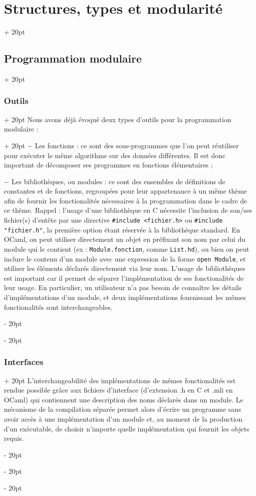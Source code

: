 \documentclass[a4paper, 12pt, twoside]{article}
\newcommand{\ind}[1][20pt]{\advance\leftskip + #1}
\newcommand{\deind}[1][20pt]{\advance\leftskip - #1}
\newenvironment{indt}[2][20pt]{#2 \par \ind[#1]}{\par \deind} %
\begin{document}
\begin{indt}{\section{Structures, types et modularité}}
\begin{indt}{\subsection{Programmation modulaire}}
\begin{indt}{\subsubsection{Outils}}
                \begin{indt}{Nous avons déjà évoqué deux types d’outils pour la programmation modulaire :}
                    $-$ Les fonctions : ce sont des sous-programmes que l’on peut réutiliser pour exécuter le même algorithme sur des données différentes. Il est donc important de décomposer ses programmes en fonctions élémentaires ;
                    
                    $-$ Les bibliothèques, ou modules : ce sont des ensembles de définitions de constantes et de fonctions, regroupées pour leur appartenance à un même thème afin de fournir les fonctionalités nécessaires à la programmation dans le cadre de ce thème.
                    Rappel : l’usage d’une bibliothèque en C nécessite l’inclusion de son/ses fichier(s) d’entête par une directive \texttt{\#include <fichier.h>} ou \texttt{\#include "fichier.h"}, la première option étant réservée à la bibliothèque standard. En OCaml, on peut utiliser directement un objet en préfixant son nom par celui du module qui le contient (ex : \texttt{Module.fonction}, comme \texttt{List.hd}), ou bien on peut inclure le contenu d’un module avec une expression de la forme \texttt{open Module}, et utiliser les éléments déclarés directement via leur nom. L’usage de bibliothèques est important car il permet de séparer l’implémentation de ses fonctionalités de leur usage. En particulier, un utilisateur n’a pas besoin de connaître les détails d’implémentations d’un module, et deux implémentations fournissant les mêmes fonctionalités sont interchangeables.
                \end{indt}
                
            \end{indt}
            
            \begin{indt}{\subsubsection{Interfaces}}
                L’interchangeabilité des implémentations de mêmes fonctionalités est rendue possible grâce aux fichiers d’interface (d’extension .h en C et .mli en OCaml) qui contiennent une description des noms déclarés dans un module. Le mécanisme de la compilation séparée permet alors d’écrire un programme sans avoir accès à une implémentation d’un module et, au moment de la production d’un exécutable, de choisir n’importe quelle implémentation qui fournit les objets requis.
                

\end{indt}
\end{indt}
\end{indt}
\end{document}
